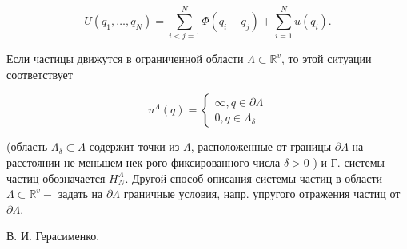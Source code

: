 \documentclass[10pt]{article}
\begin{document}
\[

U\left(q_{1}, \ldots, q_{N}\right)=\sum_{i<j=1}^{N} \Phi\left(q_{i}-q_{j}\right)+\sum_{i=1}^{N} u\left(q_{i}\right) .

\]



Если частицы движутся в ограниченной области $\Lambda \subset \mathbb{R}^{v}$, то этой ситуации соответствует



\[

u^{\Lambda}(q)=\left\{\begin{array}{l}

\infty, q \in \partial \Lambda \\

0, q \in \Lambda_{\delta}

\end{array}\right.

\]



(область $\Lambda_{\delta} \subset \Lambda$ содержит точки из $\Lambda$, расположенные от границы $\partial \Lambda$ на расстоянии не меньшем нек-рого фиксированного числа $\delta>0$ ) и Г. системы частиц обозначается $H_{N}^{\Lambda}$. Другой способ описания системы частиц в области $\Lambda \subset \mathbb{R}^{v}-$ задать на $\partial \Lambda$ граничные условия, напр. упругого отражения частиц от $\partial \Lambda$.



В. И. Герасименко.
\end{document}
